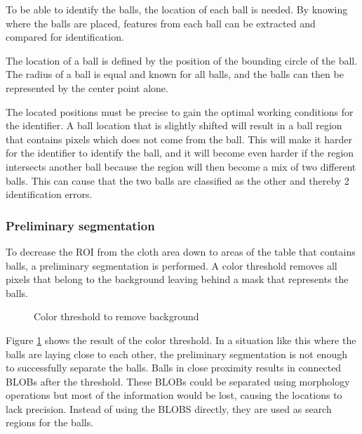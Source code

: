 To be able to identify the balls, the location of each ball is needed. By knowing where the balls are placed, features from each ball can be extracted and compared for identification.

The location of a ball is defined by the position of the bounding circle of the ball. The radius of a ball is equal  and known for all balls, and the balls can then be represented by the center point alone.

The located positions must be precise to gain the optimal working conditions for the identifier. A ball location that is slightly shifted will result in a ball region that contains pixels which does not come from the ball. This will make it harder for the identifier to identify the ball, and it will become even harder if the region intersects another ball because the region will then become a mix of two different balls. This can cause that the two balls are classified as the other and thereby 2 identification errors.

\subsubsection{Preliminary segmentation}
To decrease the ROI from the cloth area down to areas of the table that contains balls, a preliminary segmentation is performed. A color threshold removes all pixels that belong to the background leaving behind a mask that represents the balls.
\begin{figure}[h]
  \centering
  \quad           
   \caption{Color threshold to remove background}
  \label{fig:thres1}
\end{figure}
Figure \ref{fig:thres1} shows the result of the color threshold. In a situation like this where the balls are laying close to each other, the preliminary segmentation is not enough to successfully separate the balls. Balls in close proximity results in connected BLOBs after the threshold. These BLOBs could be separated using morphology operations but most of the information would be lost, causing the locations to lack precision. Instead of using the BLOBS directly, they are used as search regions for the balls.

